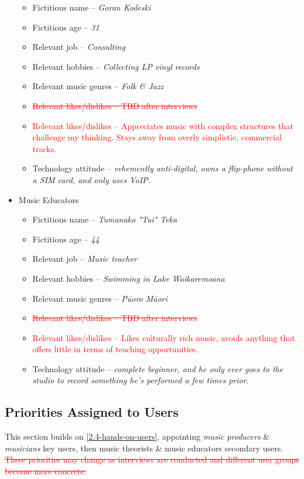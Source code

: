 \documentclass[12pt]{article}
\begin{document}
\begin{itemize}
\begin{itemize}
    \item Fictitious name -- \emph{Goran Kodeski}
    \item Fictitious age -- \emph{31}
    \item Relevant job -- \emph{Consulting}
    \item Relevant hobbies -- \emph{Collecting LP vinyl records}
    \item Relevant music genres -- \emph{Folk \& Jazz}
    \item \textcolor{red}{\sout{Relevant likes/dislikes -- TBD after interviews}}
    \item \textcolor{red}{Relevant likes/dislikes -- Appreciates music with complex structures that challenge my thinking. Stays away from overly simplistic, commercial tracks.}
    \item Technology attitude --  \emph{vehemently anti-digital, owns a flip-phone without a SIM card, and only uses VoIP.}
  \end{itemize}
  \item Music Educators
  \begin{itemize}
    \item Fictitious name -- \emph{Tumanako "Tui" Teka}
    \item Fictitious age -- \emph{44}
    \item Relevant job -- \emph{Music teacher}
    \item Relevant hobbies -- \emph{Swimming in Lake Waikaremoana}
    \item Relevant music genres -- \emph{Pūoro Māori}
    \item \textcolor{red}{\sout{Relevant likes/dislikes -- TBD after interviews}}
    \item \textcolor{red}{Relevant likes/dislikes -- Likes culturally rich music, avoids anything that offers little in terms of teaching opportunities.}
    \item Technology attitude --  \emph{complete beginner, and he only ever goes to the studio to record something he's performed a few times prior.}
  \end{itemize}
\end{itemize}
\subsection{Priorities Assigned to Users}
This section builds on \ref{2.4-hands-on-users}, appointing \emph{music producers} \& \emph{musicians} key users, then music theorists \& music educators secondary users. \textcolor{red}{\sout{These priorities may change as interviews are conducted and different user groups become more concrete.}}
\end{document}

